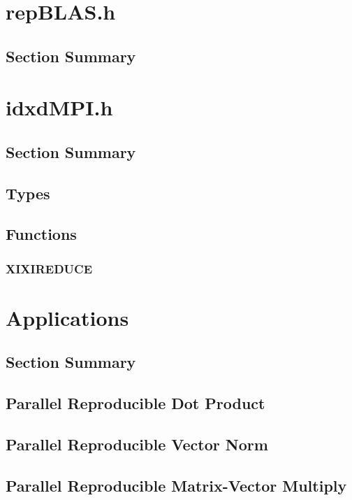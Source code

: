 \documentclass[12pt]{article}
\theoremstyle{definition}
\numberwithin{equation}{section}
\numberwithin{figure}{section}
\begin{document}
\section{repBLAS.h}
  \subsection{Section Summary}
\section{idxdMPI.h}
  \subsection{Section Summary}
  \subsection{Types}
  \subsection{Functions}
    \subsubsection{XIXIREDUCE}
\section{Applications}
  \subsection{Section Summary}
  \subsection{Parallel Reproducible Dot Product}
  \subsection{Parallel Reproducible Vector Norm}
  \subsection{Parallel Reproducible Matrix-Vector Multiply}
\end{document}
